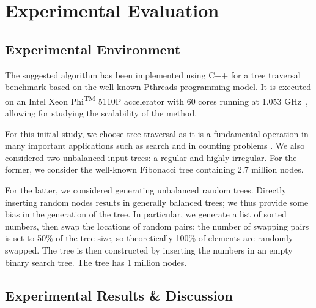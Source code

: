 \documentclass[conference,compsoc]{IEEEtran}
\begin{document}
\section{Experimental Evaluation}
\label{evaluation}
\subsection{Experimental Environment}
The suggested algorithm has been implemented using C++ for a tree traversal benchmark based on the well-known Pthreads programming model. It is executed on an Intel\textsuperscript{\textregistered} Xeon Phi\textsuperscript{TM} 5110P accelerator with 60 cores running at 1.053 GHz~\cite{xeonPhi}, allowing for studying the scalability of the method.

For this initial study, we choose tree traversal as it is a fundamental operation in many important applications such as search and in counting problems \cite{blanchet2009}. We also considered two unbalanced input trees: a regular and highly irregular. For the former, we consider the well-known Fibonacci tree containing 2.7 million nodes.

For the latter, we considered generating unbalanced random trees. Directly inserting random nodes results in generally balanced trees; we thus provide some bias in the generation of the tree. In particular, we generate a list of sorted numbers, then swap the locations of random pairs; the number of swapping pairs is set to 50\% of the tree size, so theoretically 100\% of elements are randomly swapped. The tree is then constructed by inserting the numbers in an empty binary search tree. The tree has 1 million nodes.

\subsection{Experimental Results \& Discussion}
\end{document}
